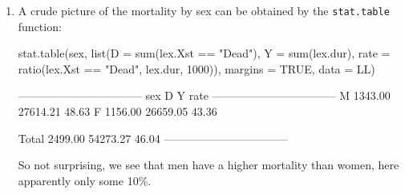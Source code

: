 \begin{enumerate}

\item A crude picture of the mortality by sex can be obtained by
  the \texttt{stat.table} function:
\begin{Schunk}
\begin{Sinput}
 stat.table(sex,
            list(D = sum(lex.Xst == "Dead"),
                 Y = sum(lex.dur),
              rate = ratio(lex.Xst == "Dead", lex.dur, 1000)),
            margins = TRUE,
            data = LL)
\end{Sinput}
\begin{Soutput}
 --------------------------------- 
 sex           D        Y    rate  
 --------------------------------- 
 M       1343.00 27614.21   48.63  
 F       1156.00 26659.05   43.36  
                                   
 Total   2499.00 54273.27   46.04  
 --------------------------------- 
\end{Soutput}
\end{Schunk}
So not surprising, we see that men have a higher mortality than women,
here apparently only some 10\%.




\end{enumerate}
